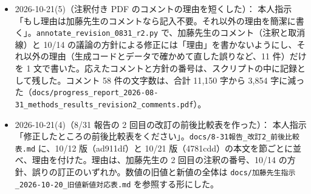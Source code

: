\documentclass[11pt,a4paper]{jsarticle}
\begin{document}
\begin{itemize}[nosep]
    \textbf{結果}：第 5〜7 章、Abstract、第 1 章の数値・表・図を c7c4feb の結果に置き換えた（設定 A の Recall@20 は 0.906 → 0.981、MAP は 0.690 → 0.860、設定 B は 0.825 → 0.966 と 0.626 → 0.832。どれも 10 通りすべてで上回る）。図は \texttt{generate\_figures\_thesis.py} を新しい JSON を読む形に書き直して作り直し、日本語の 2 図（\texttt{fig\_pfi\_recall20\_ja\_final}、\texttt{fig\_n1\_full\_coverage\_ja\_1020}）の英語版（\texttt{fig\_pfi}、\texttt{fig\_n1\_coverage}）を作った。使わなくなった \texttt{fig\_dof\_stop}・\texttt{fig\_stage1\_redesign}・\texttt{fig\_topic\_diagnosis} は消した。
    \textbf{LLM との比較}：本人の決定（「旧結果を消し、報告と同じ」）で、旧版（Sonnet 4.5 の直接生成、Opus 4.8 と Fable 5.1 の等価判定）の結果・図・$\kappa$ を消し、データベースを渡して ID で判定する新しい比較の方法を第 5 章に書いて「未実行」とした。参考文献から ClaudeOpus48・ClaudeFable51・Hangos（自由度ゼロ停止の節だけで引いていた）を外した（37 件）。
    \textbf{付録}：定数の表、baseline の重み 12 通りと提案手法の重み×不正解の選び方の表、正解式の数と入力変数の数で分けた表、$N_1$ を変えた結果、分野ごとの検索語と文献 329 件の一覧（英語版。\texttt{make\_thesis\_appendix\_tables.py} で \texttt{docs/appendix\_materials} から作り、数値・DOI・出典 ID が元の表と全行で一致することを確かめた）、合成のケースの例（\texttt{dae\_X3\_016}）、LLM に与えたプロンプトを載せた。
    本文は 1〜25 ページ（規範 20〜28 ページ）、全体 72 ページ。\texttt{latexmk} は exit 0、未定義の参照は 0。報告との違い：設定 B の MAP の差は、報告の本文では丸めた平均の差から $+0.206$ だが、分割で対にした差の平均は $+0.2053$ なので、修論では $+0.205$ と書いた。
  \item 2026-10-21(5)（注釈付き PDF のコメントの理由を短くした）：
    本人指示「もし理由は加藤先生のコメントなら記入不要。それ以外の理由を簡潔に書く」。\texttt{annotate\_revision\_0831\_r2.py} で、加藤先生のコメント（注釈と取消線）と 10/14 の議論の方針による修正には「理由」を書かないようにし、それ以外の理由（生成コードとデータで確かめて直した誤りなど、11 件）だけを 1 文で書いた。応えたコメントと方針の番号は、スクリプトの中に記録として残した。コメント 58 件の文字数は、合計 11{,}150 字から 3{,}854 字に減った（\texttt{docs/progress\_report\_2026-08-31\_methods\_results\_revision2\_comments.pdf}）。
  \item 2026-10-21(4)（8/31 報告の 2 回目の改訂の前後比較表を作った）：
    本人指示「修正したところの前後比較表をください」。\texttt{docs/8-31報告\_改訂2\_前後比較表.md} に、10/12 版（ad911df）と 10/21 版（4781cdd）の本文を節ごとに並べ、理由を付けた。理由は、加藤先生の 2 回目の注釈の番号、10/14 の方針、誤りの訂正のいずれか。数値の旧値と新値の全体は \texttt{docs/加藤先生指示\_2026-10-20\_旧値新値対応表.md} を参照する形にした。

\end{itemize}
\end{document}
